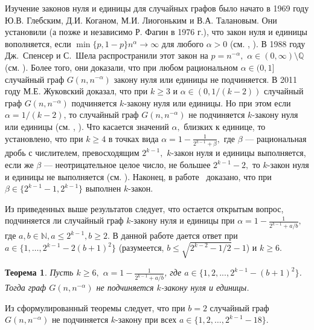 \documentclass[12pt,a4paper,russian,titlepage]{article}
\newtheorem{Th}{Теорема}
\begin{document}
Изучение законов нуля и единицы для случайных графов было начато в 1969 году Ю.В. Глебским, Д.И. Коганом,
М.И. Лиогоньким и В.А. Талановым. Они установили (а позже и независимо Р. Фагин в 1976 г.), что закон нуля и единицы вополняется, если  $\min\{p,1-p\}n^\alpha \rightarrow \infty $ для любого $\alpha > 0$ (см. \cite{Glebskii}, \cite{Fagin}). В 1988 году Дж.~Спенсер и С.~Шела распространили этот закон на $p = n^{-\alpha},$ $\alpha \in (0, \infty) \setminus \mathbb{Q}$ (см. \cite{Shelah}). Более того, они доказали, что при любом рациональном $\alpha\in(0,1]$ случайный граф $G(n,n^{-\alpha})$ закону нуля или единицы не подчиняется. В 2011 году М.Е. Жуковский доказал, что при $k\geq 3$ и $\alpha\in(0,1/(k-2))$ случайный граф $G(n,n^{-\alpha})$ подчиняется $k$-закону нуля или единицы. Но при этом если $\alpha=1/(k-2)$, то случайный граф $G(n,n^{-\alpha})$ не подчиняется $k$-закону нуля или единицы (см. \cite{Zhuk_dan}, \cite{Zhuk_law}). Что касается значений $\alpha,$ близких к единице, то установлено, что при $k\geq 4$ в точках вида $\alpha = 1 - \frac{1}{2^{k-1} + \beta}, $ где $\beta$ --- рациональная дробь с числителем, превосходящим $2^{k-1},$ $k$-закон нуля и единицы выполняется, если же $\beta$ --- неотрицательное целое число, не большее $2^{k-1} -2,$ то $k$-закон нуля и единицы не выполняется (см. \cite{Zhuk_first}). Наконец, в работе~\cite{Zhuk_second} доказано, что при $\beta\in\{2^{k-1}-1,2^{k-1}\}$ выполнен $k$-закон.

Из приведенных выше результатов следует, что остается открытым вопрос, подчиняется ли случайный граф $k$-закону нуля и единицы при $\alpha = 1 - \frac{1}{2^{k-1} + a/b},$ где
$a,b \in \mathbb{N}, a \leq 2^{k-1}, b \geq 2.$ В данной работе дается ответ при $a\in\{1,\ldots,2^{k-1} - 2(b+1)^2\}$ (разумеется, $b\leq\sqrt{2^{k-2}-1/2}-1$) и $k\geq 6$.

\begin{Th}
Пусть $k\geq 6,$ $\alpha = 1 - \frac{1}{2^{k-1} + a/b}$, где $a \in \{1, 2, ..., 2^{k-1} - (b+1)^2\}$. Тогда граф $G(n, n^{-\alpha})$ не подчиняется $k$-закону нуля и единицы.
\label{main}
\end{Th}

Из сформулированный теоремы следует, что при $b=2$ случайный граф $G(n,n^{-\alpha})$ не подчиняется $k$-закону при всех $a\in\{1,2,\ldots,2^{k-1}-18\}$.

\end{document}
